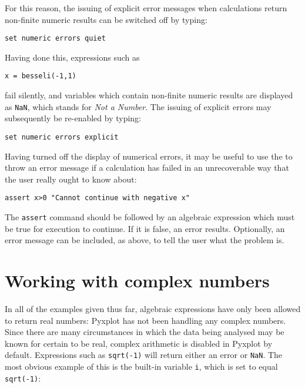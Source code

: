 For this reason, the issuing of explicit error messages when calculations
return non-finite numeric results can be switched off by typing:

\begin{verbatim}
set numeric errors quiet
\end{verbatim}

\noindent Having done this, expressions such as

\begin{verbatim}
x = besseli(-1,1)
\end{verbatim}

\noindent fail silently, and variables which contain non-finite numeric results
are displayed as {\tt NaN}, which stands for {\it Not a
Number}.  The issuing of explicit errors may subsequently
be re-enabled by typing: 

\begin{verbatim}
set numeric errors explicit
\end{verbatim}

Having turned off the display of numerical errors, it may be useful to use the
 to throw an error message if a calculation has failed in an
unrecoverable way that the user really ought to know about:

\begin{verbatim}
assert x>0 "Cannot continue with negative x"
\end{verbatim}

The {\tt assert} command should be followed by an algebraic expression which
must be true for execution to continue. If it is false, an error results.
Optionally, an error message can be included, as above, to tell the user what
the problem is.

\section{Working with complex numbers}
\label{sec:complex_numbers}

In all of the examples given thus far, algebraic expressions have only been
allowed to return real numbers: Pyxplot has not been handling any complex
numbers. Since there are many circumstances in which the data being analysed
may be known for certain to be real, complex arithmetic is disabled in Pyxplot
by default.  Expressions such as {\tt sqrt(-1)} will return either an error or
{\tt NaN}.  The most obvious example of this is the built-in variable {\tt i},
which is set to equal {\tt sqrt(-1)}:

